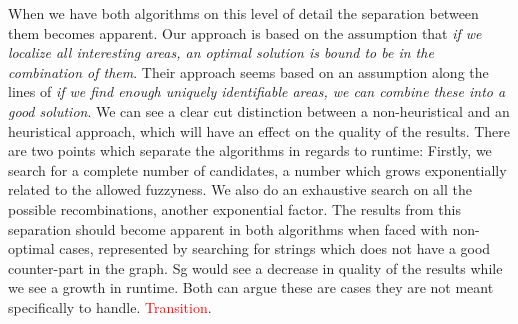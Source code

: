 \documentclass[thesis.tex]{subfiles}
\begin{document}
\par\noindent
When we have both algorithms on this level of detail the separation between them becomes apparent. Our approach is based on the assumption that \textit{if we localize all interesting areas, an optimal solution is bound to be in the combination of them}. Their approach seems based on an assumption along the lines of \textit{if we find enough uniquely identifiable areas, we can combine these into a good solution}. We can see a clear cut distinction between a non-heuristical and an heuristical approach, which will have an effect on the quality of the results. There are two points which separate the algorithms in regards to runtime: Firstly, we search for a complete number of candidates, a number which grows exponentially related to the allowed fuzzyness. We also do an exhaustive search on all the possible recombinations, another exponential factor. The results from this separation should become apparent in both algorithms when faced with non-optimal cases, represented by searching for strings which does not have a good counter-part in the graph. Sg would see a decrease in quality of the results while we see a growth in runtime. Both can argue these are cases they are not meant specifically to handle. \textcolor{red}{Transition}.
\end{document}

